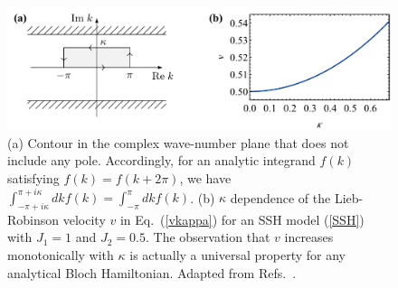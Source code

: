 \documentclass{tADP2e}
\theoremstyle{plain}
\theoremstyle{plain}
\theoremstyle{definition}
\begin{document}
\begin{figure}[!t]
\begin{center}
\includegraphics[width=12cm]{./Figures/fig_4_LR.pdf}
\end{center}
\caption{(a) Contour in the complex wave-number plane that does not include any pole. Accordingly, for an analytic integrand $f(k)$ satisfying $f(k)=f(k+2\pi)$, we have $\int^{\pi+i\kappa}_{-\pi+i\kappa} dkf(k)=\int^\pi_{-\pi} dkf(k)$. (b) $\kappa$ dependence of the Lieb-Robinson velocity $v$ in Eq.~(\ref{vkappa}) for an SSH model (\ref{SSH}) with $J_1=1$ and $J_2=0.5$. The observation that $v$ increases monotonically with $\kappa$ is actually a universal property for any analytical Bloch Hamiltonian. Adapted from Refs.~\cite{ZG2019}.}
\label{fig:LR}
\end{figure}
\end{document}
